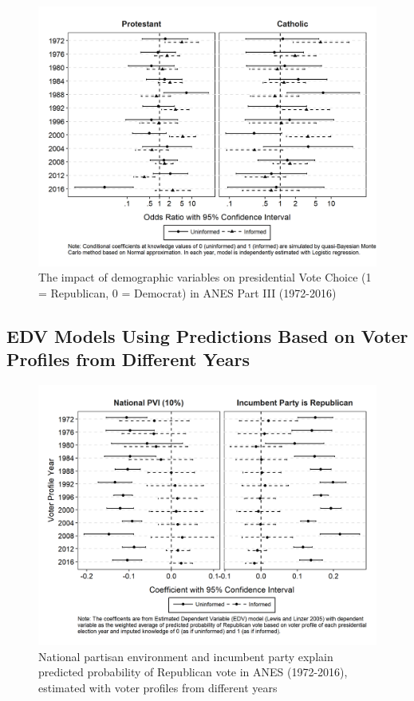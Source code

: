 \begin{figure}[ht!!!]
    \caption{The impact of demographic variables on presidential Vote Choice (1 = Republican, 0 = Democrat) in ANES Part III (1972-2016)}
    \label{fig:anescoefplot_dem3}
    \includegraphics[width=\linewidth]{../outputs/m1sq_anescoefplot_dem3.png}
\end{figure}

\clearpage
\subsection{EDV Models Using Predictions Based on Voter Profiles from Different Years}

\begin{figure}[ht!!!]
    \caption{National partisan environment and incumbent party explain predicted probability of Republican vote in ANES (1972-2016), estimated with voter profiles from different years}
    \label{fig:anespredtable}
    \includegraphics[width=\linewidth]{../outputs/m1sq_anespredtable.png}
\end{figure}

